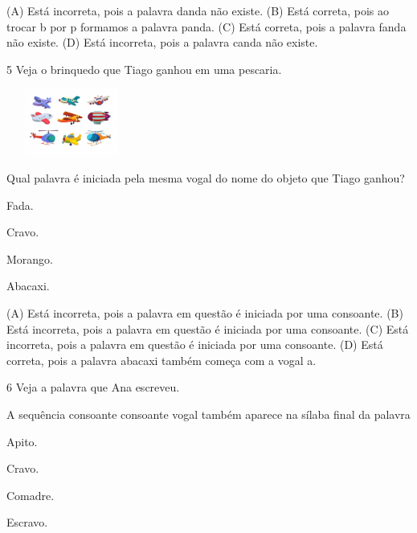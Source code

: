 (A) Está incorreta, pois a palavra danda não existe.
(B) Está correta, pois ao trocar b por p formamos a palavra panda.
(C) Está correta, pois a palavra fanda não existe.
(D) Está incorreta, pois a palavra canda não existe.

\num{5} Veja o brinquedo que Tiago ganhou em uma pescaria.

\includegraphics[width=1.69097in,height=0.86538in]{media/image177.jpeg}


Qual palavra é iniciada pela mesma vogal do nome do objeto que Tiago ganhou?

\begin{minipage}{.5\textwidth}
\begin{escolha}
\item Fada.

\item Cravo.

\item Morango.

\item Abacaxi.
\end{escolha}
\end{minipage}

(A) Está incorreta, pois a palavra em questão é iniciada por uma consoante.
(B) Está incorreta, pois a palavra em questão é iniciada por uma consoante.
(C) Está incorreta, pois a palavra em questão é iniciada por uma consoante.
(D) Está correta, pois a palavra abacaxi também começa com a vogal a.

\num{6} Veja a palavra que Ana escreveu.


A sequência consoante consoante vogal também aparece na sílaba final da palavra

\begin{minipage}{.5\textwidth}
\begin{escolha}
\item Apito.

\item Cravo.

\item Comadre.

\item Escravo.
\end{escolha}
\end{minipage}


